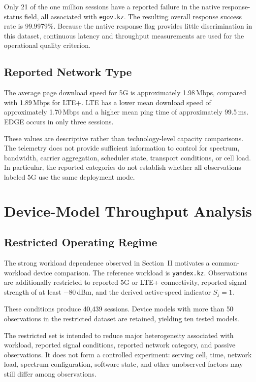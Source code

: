 \documentclass[conference]{IEEEtran}
\begin{document}
Only 21 of the one million sessions have a reported failure in the native response-status field, all associated with \texttt{egov.kz}. The resulting overall response success rate is 99.9979\%. Because the native response flag provides little discrimination in this dataset, continuous latency and throughput measurements are used for the operational quality criterion.

\subsection{Reported Network Type}

The average page download speed for 5G is approximately 1.98\,Mbps, compared with 1.89\,Mbps for LTE+. LTE has a lower mean download speed of approximately 1.70\,Mbps and a higher mean ping time of approximately 99.5\,ms. EDGE occurs in only three sessions.

These values are descriptive rather than technology-level capacity comparisons. The telemetry does not provide sufficient information to control for spectrum, bandwidth, carrier aggregation, scheduler state, transport conditions, or cell load. In particular, the reported categories do not establish whether all observations labeled 5G use the same deployment mode.

\section{Device-Model Throughput Analysis}

\subsection{Restricted Operating Regime}

The strong workload dependence observed in Section~II motivates a common-workload device comparison. The reference workload is \texttt{yandex.kz}. Observations are additionally restricted to reported 5G or LTE+ connectivity, reported signal strength of at least $-80$\,dBm, and the derived active-speed indicator $S_j=1$.

These conditions produce 40,439 sessions. Device models with more than 50 observations in the restricted dataset are retained, yielding ten tested models.

The restricted set is intended to reduce major heterogeneity associated with workload, reported signal conditions, reported network category, and passive observations. It does not form a controlled experiment: serving cell, time, network load, spectrum configuration, software state, and other unobserved factors may still differ among observations.
\end{document}
